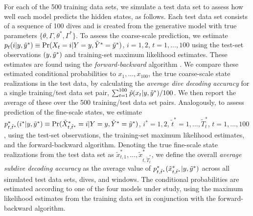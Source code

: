 For each of the 500 training data sets, we simulate a test data set to assess how well each model predicts the hidden states, as follows.
Each test data set consists of a sequence of 100 dives and is created from the generative model with true parameters $\{\theta, \Gamma, \theta^*, \Gamma^*\}$.
To assess the coarse-scale prediction, we estimate $p_t(i|y,\tilde{y}^*) \equiv \Pr(X_t=i|Y=y,\tilde{Y}^*=\tilde{y}^*)$, $i=1,2$, $t=1,\ldots,100$ using the test-set observations $(y,\tilde{y}^*)$ and training-set maximum likelihood estimates. These estimates are found using the {\em{forward-backward}} algorithm \citep{Zucchini:2016}. We compare these estimated conditional probabilities to $x_1,\ldots,x_{100}$, the true coarse-scale state realizations in the test data, by calculating the {\em{average dive decoding accuracy}} for a single training/test data set pair, $\sum_{t=1}^{100} \hat{p}(x_t|y,\tilde{y}^*)/100$. We then report the average of these over the 500 training/test data set pairs. 
Analogously, to assess prediction of the fine-scale states, we estimate $p^*_{t,\tilde t^*}(i^*|y,\tilde{y}^*) \equiv \Pr(\tilde X^*_{t,\tilde t^*}=i|Y=y,\tilde{Y}^*=\tilde{y}^*)$, $i^*=1,2$, $\tilde t^* = 1,\ldots,\tilde T^*_t$, $t=1,\ldots,100$, using the test-set observations, the training-set maximum likelihood estimates, and the forward-backward algorithm. Denoting the true fine-scale state realizations from the test data set as $\tilde x^*_{t,1},\ldots,\tilde x^*_{t,\tilde T^*_t}$, we define the overall \textit{average subdive decoding accuracy} as the average value of $p^*_{t,\tilde t^*}(\tilde x^*_{t,\tilde t^*}|y,\tilde{y}^*)$ across all simulated test data sets, dives, and windows. The conditional probabilities are estimated according to one of the four models under study, using the maximum likelihood estimates from the training data set in conjunction with the forward-backward algorithm.

